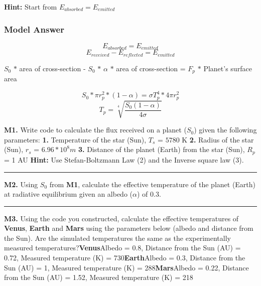 \documentclass[
  letterpaper,
  DIV=11,
  numbers=noendperiod]{scrartcl}
\begin{document}
\textbf{Hint:} Start from \(E_{absorbed} = E_{emitted}\)

\subsubsection{\texorpdfstring{\textbf{Model Answer}}{Model Answer}}

\[E_{absorbed} = E_{emitted}\]
\[E_{received} - E_{reflected} = E_{emitted}\]

\(S_0\) \(*\) area of cross-section - \(S_0\) \(*\) \(\alpha\) \(*\)
area of cross-section = \(F_p\) \(*\) Planet's surface area

\[S_0 * \pi r_p^2 * (1 - \alpha) = \sigma T_p^4 * 4 \pi r_p^2\]
\[T_{p} = \sqrt[4]{\frac{S_0(1-\alpha)}{4\sigma}}\]

\begin{tcolorbox}[enhanced jigsaw, titlerule=0mm, title={Modelling Questions}, arc=.35mm, breakable, colback=white, toprule=.15mm, colframe=quarto-callout-caution-color-frame, opacityback=0, bottomtitle=1mm, coltitle=black, toptitle=1mm, rightrule=.15mm, colbacktitle=quarto-callout-caution-color!10!white, bottomrule=.15mm, opacitybacktitle=0.6, leftrule=.75mm, left=2mm]

\textbf{M1.} Write code to calculate the flux received on a planet
(\(S_0\)) given the following parameters: \textbf{1.} Temperature of the
star (Sun), \(T_s\) = \(5780\) K \textbf{2.} Radius of the star (Sun),
\(r_s\) = \(6.96 * 10^8 m\) \textbf{3.} Distance of the planet (Earth)
from the star (Sun), \(R_p\) = 1 AU \textbf{Hint:} Use Stefan-Boltzmann
Law (2) and the Inverse square law (3).

\begin{center}\rule{0.5\linewidth}{0.5pt}\end{center}

\textbf{M2.} Using \(S_0\) from \textbf{M1}, calculate the effective
temperature of the planet (Earth) at radiative equilibrium given an
albedo (\(\alpha\)) of 0.3.

\begin{center}\rule{0.5\linewidth}{0.5pt}\end{center}

\textbf{M3.} Using the code you constructed, calculate the effective
temperatures of \textbf{Venus}, \textbf{Earth} and \textbf{Mars} using
the parameters below (albedo and distance from the Sun). Are the
simulated temperatures the same as the experimentally measured
temperatures?\textbf{Venus}Albedo = 0.8, Distance from the Sun (AU) =
0.72, Measured temperature (K) = 730\textbf{Earth}Albedo = 0.3, Distance
from the Sun (AU) = 1, Measured temperature (K) = 288\textbf{Mars}Albedo
= 0.22, Distance from the Sun (AU) = 1.52, Measured temperature (K) =
218

\end{tcolorbox}
\end{document}
